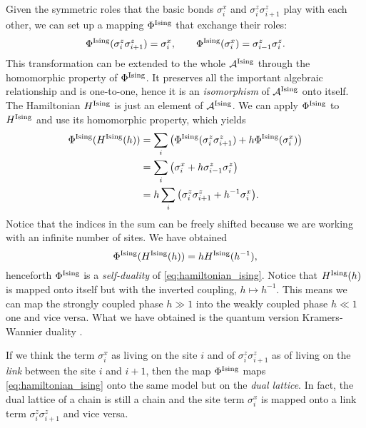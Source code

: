 Given the symmetric roles that the basic bonds $\sigma^x_i$ and $\sigma^z_i \sigma^z_{i+1}$ play with each other, we can set up a mapping $\Phi^{\text{Ising}}$ that exchange their roles:
\begin{equation}
    \Phi^{\text{Ising}}(\sigma^z_i \sigma^z_{i+1}) = \sigma^x_i, \qquad
    \Phi^{\text{Ising}}(\sigma^x_i) = \sigma^z_{i-1} \sigma^z_{i}.
    \label{eq:duality_ising}
\end{equation}
This transformation can be extended to the whole $\mathcal{A}^{\text{Ising}}$ through the homomorphic property of $\Phi^{\text{Ising}}$.
It preserves all the important algebraic relationship and is one-to-one, hence it is an \emph{isomorphism} of $\mathcal{A}^{\text{Ising}}$ onto itself.
The Hamiltonian $H^{\text{Ising}}$ is just an element of $\mathcal{A}^{\text{Ising}}$.
We can apply $\Phi^{\text{Ising}}$ to $H^{\text{Ising}}$ and use its homomorphic property, which yields
\begin{equation}
    \begin{split}
        \Phi^{\ising}( \HIsing(h) )
        & = \sum_{i} \pqty{ \Phi^{\ising} (\sigma^z_i \sigma^z_{i+1}) + h \Phi^{\ising}(\sigma^x_i)} \\
        & = \sum_{i} \pqty{ \sigma^x_i + h \sigma^z_{i-1} \sigma^z_{i}} \\
        & = h \sum_{i} \pqty{ \sigma^z_i \sigma^z_{i+1} + h^{-1} \sigma^x_i}.
    \end{split}
\end{equation}
Notice that the indices in the sum can be freely shifted because we are working with an infinite number of sites.
We have obtained
\begin{equation}
    \Phi^{\text{Ising}} (H^{\text{Ising}}(h)) = h H^{\text{Ising}}(h^{-1}),
\end{equation}
henceforth $\Phi^{\text{Ising}}$ is a \emph{self-duality} of \eqref{eq:hamiltonian_ising}.
Notice that $H^{\text{Ising}}(h)$ is mapped onto itself but with the inverted coupling, $h \mapsto h^{-1}$.
This means we can map the strongly coupled phase $h \gg 1$ into the weakly coupled phase $h \ll 1$ one and vice versa.
What we have obtained is the quantum version Kramers-Wannier duality \cite{kramers1941statistics, fradkin1978order}.

If we think the term $\sigma^x_i$ as living on the site $i$ and of $\sigma^z_i \sigma^z_{i+1}$ as of living on the \emph{link} between the site $i$ and $i+1$, then the map $\Phi^{\text{Ising}}$ maps \eqref{eq:hamiltonian_ising} onto the same model but on the \emph{dual lattice}.
In fact, the dual lattice of a chain is still a chain and the site term $\sigma^x_i$ is mapped onto a link term $\sigma^z_i \sigma^z_{i+1}$ and vice versa.


